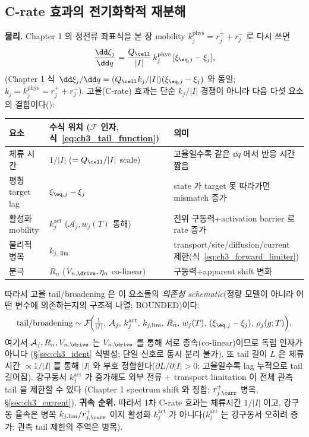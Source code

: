 \subsection{C-rate 효과의 전기화학적 재분해}\label{sec:ch3_crate}
\textbf{물리.} Chapter 1 의 정전류 좌표식을 본 장 mobility $k_j^{\mathrm{phys}}=r_j^++r_j^-$ 로 다시 쓰면
\begin{equation}
\frac{\dd\xi_j}{\dd q}=\frac{Q_\cell}{|I|}\,k_j^{\mathrm{phys}}\,[\xi_{\eq,j}-\xi_j],
\label{eq:ch3_crate}
\end{equation}
(Chapter 1 식~$\dd\xi_j/\dd q=(Q_\cell k_j/|I|)(\xi_{\eq,j}-\xi_j)$ 와 동일; $k_j=k_j^{\mathrm{phys}}=r_j^++r_j^-$).
고율(C-rate) 효과는 단순 $k_j/|I|$ 경쟁이 아니라 다음 다섯 요소의 결합이다():
\begin{longtable}{p{} >{\raggedright\arraybackslash}p{} >{\raggedright\arraybackslash}p{}}
\toprule 요소 & 수식 위치 ($\mathcal F$ 인자, 식~\eqref{eq:ch3_tail_function}) & 의미 \\ \midrule \endhead
체류 시간 & $1/|I|$ ($=Q_\cell/|I|$ scale) & 고율일수록 같은 $\dd q$ 에서 반응 시간 짧음 \\
평형 target lag & $\xi_{\eq,j}-\xi_j$ & state 가 target 못 따라가면 mismatch 증가 \\
활성화 mobility & $k_j^{\mathrm{act}}$ ($\mathcal A_j,w_j(T)$ 통해) & 전위 구동력+activation barrier 로 rate 증가 \\
물리적 병목 & $k_{j,\lim}$ & transport/site/diffusion/current 제한(식~\eqref{eq:ch3_forward_limiter}) \\
분극 & $R_n$ ($V_{n,\drive},\eta_n$ co-linear) & 구동력+apparent shift 변화 \\
\bottomrule
\end{longtable}
따라서 고율 tail/broadening 은 이 요소들의 \emph{의존성 schematic}(정량 모델이 아니라 어떤 변수에 의존하는지의
구조적 나열; BOUNDED)이다:
\begin{equation}
\mathrm{tail/broadening}\sim\mathcal F\!\Big(\tfrac{1}{|I|},\,\mathcal A_j,\,k_j^{\mathrm{act}},\,k_{j,\lim},\,R_n,\,
w_j(T),\,(\xi_{\eq,j}-\xi_j),\,\rho_j(g;T)\Big).
\label{eq:ch3_tail_function}
\end{equation}
여기서 $\mathcal A_j,R_n,V_{n,\drive}$ 는 $V_{n,\drive}$ 를 통해 서로 종속(co-linear)이므로 독립 인자가 아니다
(\S\ref{sec:ch3_ident} 식별성; 단일 신호로 동시 분리 불가). 또 tail 길이 $L$ 은 체류시간 $\propto1/|I|$ 를 통해
$|I|$ 와 부호 정합한다($\partial L/\partial|I|>0$: 고율일수록 lag 누적으로 tail 길어짐).
강구동서 $k_j^{\mathrm{act}}$ 가 증가해도 외부 전류 + transport limitation 이 전체 관측 tail 을 제한할 수 있다
(Chapter 1 spectrum shift 와 정합; $r_{j,\curr}^+$ 병목, \S\ref{sec:ch3_current}). \textbf{귀속 순위.} 따라서
1차 C-rate 효과는 체류시간 $1/|I|$ 이고, 강구동 율속은 병목 $k_{j,\lim}/r_{j,\curr}^+$ 이지 활성화 $k_j^{\mathrm{act}}$
가 아니다($k_j^{\mathrm{act}}$ 는 강구동서 오히려 증가; 관측 tail 제한의 주역은 병목).

